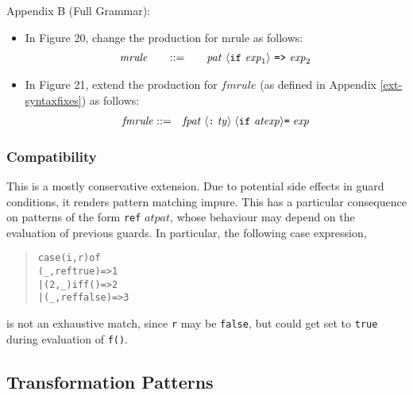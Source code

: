 \documentclass[twoside,titlepage]{article}
\begin{document}
\begin{appendix}
{Appendix B (Full Grammar):
\begin{itemize}
\item In Figure 20, change the production for mrule as follows: 
  $$
  \begin{array}{l@{\qquad}l@{\qquad}l}
   \mathit{mrule} &::= & \mathit{pat}~\langle{\tt{if}}~\mathit{exp}_1\rangle~\mbox{\tt=>}~\mathit{exp}_2
  \end{array}
  $$

\item In Figure 21, extend the production for $\mathit{fmrule}$ (as defined in Appendix \ref{ext-syntaxfixes}) as follows:
  \begin{eqnarray*}
  \mathit{fmrule} &::=& \mathit{fpat} \; \langle\mbox{\tt:} \; \mathit{ty}\rangle \; \langle{\tt{if}}~\mathit{atexp}\rangle \mbox{\tt=} \; \mathit{exp}
  \end{eqnarray*}
\end{itemize}

\subsubsection*{Compatibility}

This is a mostly conservative extension.
Due to potential side effects in guard conditions, it renders pattern matching impure. This has a particular consequence on patterns of the form {\tt ref} $\mathit{atpat}$, whose behaviour may depend on the evaluation of previous guards. In particular, the following case expression,
\begin{quote}
\begin{alltt}
case (i, r) of
    (\_, ref true) => 1
  | (2, \_) if f() => 2
  | (\_, ref false) => 3
\end{alltt}
\end{quote}
is not an exhaustive match, since {\tt r} may be {\tt false}, but could get set to {\tt true} during evaluation of {\tt f()}.
}


\subsection{Transformation Patterns}
\label{ext-transformation}


\end{appendix}
\end{document}
